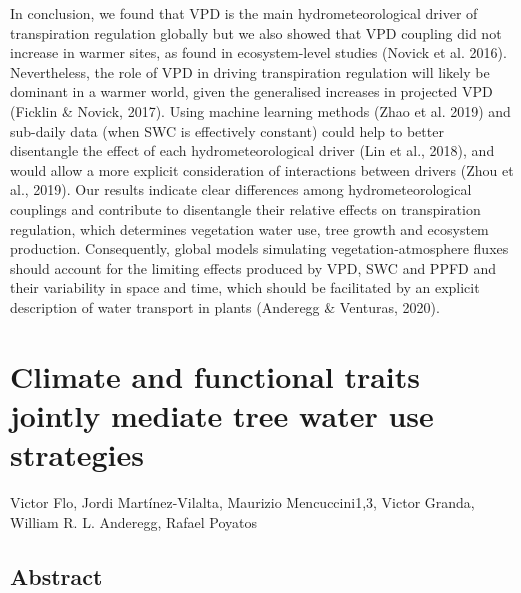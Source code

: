 \documentclass[11pt,twoside]{reedthesis}
\begin{document}
In conclusion, we found that VPD is the main hydrometeorological driver
of transpiration regulation globally but we also showed that VPD
coupling did not increase in warmer sites, as found in ecosystem-level
studies (Novick et al. 2016). Nevertheless, the role of VPD in driving
transpiration regulation will likely be dominant in a warmer world,
given the generalised increases in projected VPD (Ficklin \& Novick,
2017). Using machine learning methods (Zhao et al. 2019) and sub-daily
data (when SWC is effectively constant) could help to better disentangle
the effect of each hydrometeorological driver (Lin et al., 2018), and
would allow a more explicit consideration of interactions between
drivers (Zhou et al., 2019). Our results indicate clear differences
among hydrometeorological couplings and contribute to disentangle their
relative effects on transpiration regulation, which determines
vegetation water use, tree growth and ecosystem production.
Consequently, global models simulating vegetation-atmosphere fluxes
should account for the limiting effects produced by VPD, SWC and PPFD
and their variability in space and time, which should be facilitated by
an explicit description of water transport in plants (Anderegg \&
Venturas, 2020).\par

\newpage

\chapter[Climate and functional traits jointly mediate tree water use strategies]{Climate and functional traits jointly mediate tree water use strategies}

\setlength{\parindent}{0pt} Victor Flo, Jordi Martínez-Vilalta, Maurizio
Mencuccini1,3, Victor Granda, William R. L. Anderegg, Rafael Poyatos

\newpage

\setlength{\parindent}{30pt}

\section*{Abstract}
\end{document}
